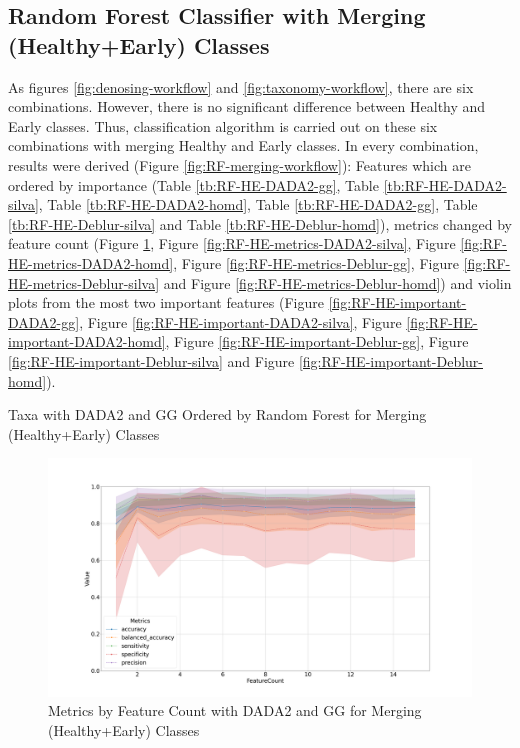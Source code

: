\documentclass[a4paper]{article}
\begin{document}
{        \subsection{Random Forest Classifier with Merging (Healthy+Early) Classes}
            As figures \ref{fig:denosing-workflow} and \ref{fig:taxonomy-workflow}, there are six combinations. However, there is no significant difference between Healthy and Early classes. Thus, classification algorithm is carried out on these six combinations with merging Healthy and Early classes. In every combination, results were derived (Figure \ref{fig:RF-merging-workflow}): Features which are ordered by importance (Table \ref{tb:RF-HE-DADA2-gg}, Table \ref{tb:RF-HE-DADA2-silva}, Table \ref{tb:RF-HE-DADA2-homd}, Table \ref{tb:RF-HE-DADA2-gg}, Table \ref{tb:RF-HE-Deblur-silva} and Table \ref{tb:RF-HE-Deblur-homd}), metrics changed by feature count (Figure \ref{fig:RF-HE-metrics-DADA2-gg}, Figure \ref{fig:RF-HE-metrics-DADA2-silva}, Figure \ref{fig:RF-HE-metrics-DADA2-homd}, Figure \ref{fig:RF-HE-metrics-Deblur-gg}, Figure \ref{fig:RF-HE-metrics-Deblur-silva} and Figure \ref{fig:RF-HE-metrics-Deblur-homd}) and violin plots from the most two important features (Figure \ref{fig:RF-HE-important-DADA2-gg}, Figure \ref{fig:RF-HE-important-DADA2-silva}, Figure \ref{fig:RF-HE-important-DADA2-homd}, Figure \ref{fig:RF-HE-important-Deblur-gg}, Figure \ref{fig:RF-HE-important-Deblur-silva} and Figure \ref{fig:RF-HE-important-Deblur-homd}).

            \begin{table}[p]
                \centering
                \caption{Taxa with DADA2 and GG Ordered by Random Forest for Merging (Healthy+Early) Classes}
                \label{tb:RF-HE-DADA2-gg}

            \end{table}

            \begin{figure}[p]
                \centering
                \includegraphics[width=0.7 \linewidth]{figures/RandomForest/one.DADA2.gg/metrics.png}
                \caption{Metrics by Feature Count with DADA2 and GG for Merging (Healthy+Early) Classes}
                \label{fig:RF-HE-metrics-DADA2-gg}
            \end{figure}

}
\end{document}
